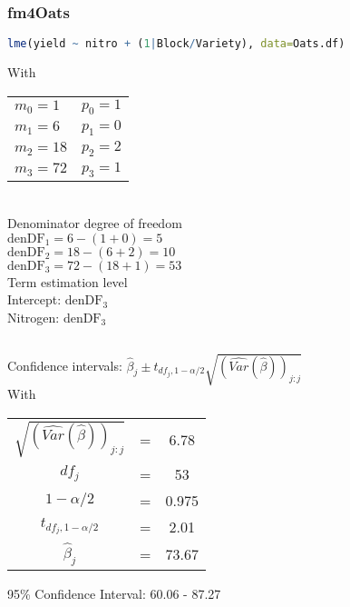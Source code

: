 \documentclass[a4paper,12pt]{article}
\begin{document}
	
		\subsubsection*{fm4Oats}
		\begin{lstlisting}[language=R]
lme(yield ~ nitro + (1|Block/Variety), data=Oats.df)
		\end{lstlisting}
		
		With\\[1mm]
		\begin{tabular}{m{9cm}m{5cm}}
			$m_0 = 1$ & $p_0 = 1$ \\
			$m_1 = 6$ & $p_1 = 0$ \\
			$m_2 = 18$ & $p_2 = 2$ \\
			$m_3 = 72$ & $p_3 = 1$
		\end{tabular}\\
	
		Denominator degree of freedom\\[1mm]
		$\text{denDF}_1 = 6 - (1 + 0) = 5$\\
		$\text{denDF}_2 = 18 - (6 + 2) = 10$\\
		$\text{denDF}_3 = 72 - (18 + 1) = 53$\\
		
		Term estimation level\\[1mm]
		Intercept: $\text{denDF}_3$\\
		Nitrogen: $\text{denDF}_3$\\[2em]
		
		\newpage
		\subsection{}
		Confidence intervals: $\hat{\beta}_j \pm t_{df_j,1-\alpha/2} \sqrt{\left(\hat{Var}\left(\hat{\beta}\right)\right)_{j:j}}$\\
		
		With\\[1.5mm]
		\begin{tabular}{c c c}
			$\sqrt{\left(\hat{Var}\left(\hat{\beta}\right)\right)_{j:j}}$ & = & 6.78\\
			$df_j$ & = & 53\\
			$1-\alpha/2$ & = & 0.975\\
			$t_{df_j,1-\alpha/2}$ & = & 2.01\\
			$\hat{\beta}_j$ & = & 73.67\\
		\end{tabular}
		
		95\% Confidence Interval: 60.06 - 87.27
		
\end{document}
